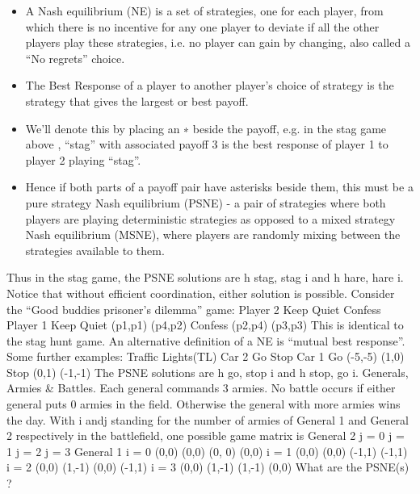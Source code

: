 \begin{itemize}
\item A Nash equilibrium (NE) is a set of strategies, one for each player, from which there
is no incentive for any one player to deviate if all the other players play these strategies,
i.e. no player can gain by changing, also called a “No regrets” choice. 
\item The Best Response
of a player to another player’s choice of strategy is the strategy that gives the largest or
best payoff. 
\item We’ll denote this by placing an ∗ beside the payoff, e.g. in the stag game
above , “stag” with associated payoff 3 is the best response of player 1 to player 2 playing
“stag”. 
\item Hence if both parts of a payoff pair have asterisks beside them, this must be a pure
strategy Nash equilibrium (PSNE) - a pair of strategies where both players are playing
deterministic strategies as opposed to a mixed strategy Nash equilibrium (MSNE), where
players are randomly mixing between the strategies available to them.
\end{itemize}

Thus in the stag game, the PSNE solutions are h stag, stag i and h hare, hare i. Notice
that without efficient coordination, either solution is possible.
Consider the “Good buddies prisoner’s dilemma” game:
Player 2
Keep Quiet Confess
Player 1 Keep Quiet (p1,p1) (p4,p2)
Confess (p2,p4) (p3,p3)
This is identical to the stag hunt game.
An alternative definition of a NE is “mutual best response”. Some further examples:
Traffic Lights(TL)
Car 2
Go Stop
Car 1 Go (-5,-5) (1,0)
Stop (0,1) (-1,-1)
The PSNE solutions are h go, stop i and h stop, go i.
Generals, Armies & Battles. Each general commands 3 armies. No battle occurs if either
general puts 0 armies in the field. Otherwise the general with more armies wins the day.
With i andj standing for the number of armies of General 1 and General 2 respectively
in the battlefield, one possible game matrix is
General 2
j = 0 j = 1 j = 2 j = 3
General 1
i = 0 (0,0) (0,0) (0, 0) (0,0)
i = 1 (0,0) (0,0) (-1,1) (-1,1)
i = 2 (0,0) (1,-1) (0,0) (-1,1)
i = 3 (0,0) (1,-1) (1,-1) (0,0)
What are the PSNE(s) ?
